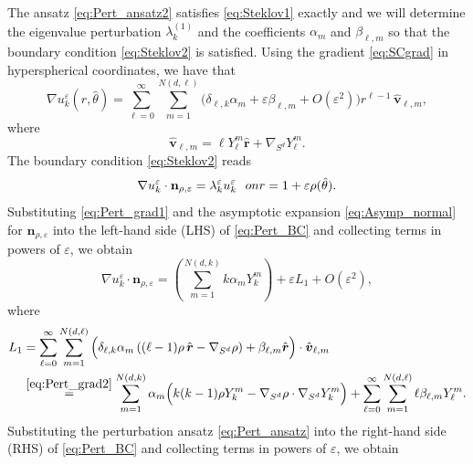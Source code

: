 \documentclass[11pt]{amsart}
\theoremstyle{definition}
\theoremstyle{plain}
\theoremstyle{remark}
\newcommand{\vareps}{\varepsilon}
\newcommand{\n}{\mathbf{n}}
\newcommand{\tn}{\textnormal}
\renewcommand{\vec}[1]{\hat{\boldsymbol{#1}}}
\begin{document}
The ansatz \eqref{eq:Pert_ansatz2} satisfies \eqref{eq:Steklov1} exactly and we will determine the eigenvalue perturbation $\lambda_k^{(1)}$ and the coefficients $\alpha_m$ and $\beta_{\ell, m}$ so that the boundary condition \eqref{eq:Steklov2} is satisfied. Using the gradient \eqref{eq:SCgrad} in hyperspherical coordinates, we have that 
\begin{equation} \label{eq:Pert_grad1} 
\nabla u_k^\vareps(r, \hat\theta) = \sum_{\ell = 0}^\infty\sum_{m = 1}^{N(d, \ell)} \Big(\delta_{\ell, k}\alpha_m + \vareps\beta_{\ell, m} + O(\vareps^2)\Big) r^{\ell - 1}\, \vec{v}_{\ell, m}, 
\end{equation} 
where 
\begin{equation} \label{eq:Pert_grad2} 
\vec{v}_{\ell, m} = \ell Y_\ell^m\vec{r} + \nabla_{S^d}Y_\ell^m. 
\end{equation} 
The boundary condition \eqref{eq:Steklov2} reads 
\begin{equation} \label{eq:Pert_BC} 
\nabla u_k^\vareps\cdot \n_{\rho, \vareps} = \lambda_k^\vareps u_k^\vareps \ \ \tn{ on } r = 1 + \vareps\rho(\hat\theta). 
\end{equation} 
Substituting \eqref{eq:Pert_grad1} and the asymptotic expansion \eqref{eq:Asymp_normal} for $\n_{\rho, \vareps}$ into the left-hand side (LHS) of \eqref{eq:Pert_BC} and collecting terms in powers of $\vareps$, we obtain 
\begin{equation*} 
\nabla u_k^\vareps\cdot\n_{\rho, \vareps} = \left(\sum_{m = 1}^{N(d, k)} k\alpha_m Y_k^m\right) + \vareps L_1 + O(\vareps^2),
\end{equation*} 
where 
\begin{align*} 
L_1 & = \sum_{\ell = 0}^\infty\sum_{m = 1}^{N(d, \ell)} \Big(\delta_{\ell, k}\alpha_m\left((\ell - 1)\rho\, \vec{r} - \nabla_{S^d}\rho\right) + \beta_{\ell, m}\vec{r}\Big)\cdot\vec{v}_{\ell, m} \\ 
& \stackrel{\eqref{eq:Pert_grad2}}{=} \sum_{m = 1}^{N(d, k)} \alpha_m\Big(k(k - 1)\rho Y_k^m - \nabla_{S^d}\rho\cdot\nabla_{S^d}Y_k^m\Big) + \sum_{\ell = 0}^\infty\sum_{m = 1}^{N(d, \ell)} \ell \beta_{\ell, m}Y_\ell^m. 
\end{align*} 
Substituting the perturbation ansatz \eqref{eq:Pert_ansatz} into the right-hand side (RHS) of \eqref{eq:Pert_BC} and collecting terms in powers of $\vareps$, we obtain 
\end{document}
